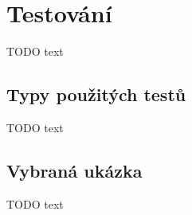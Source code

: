 \chapter{Testování}

TODO text

\section{Typy použitých testů}

TODO text

\section{Vybraná ukázka}

TODO text
